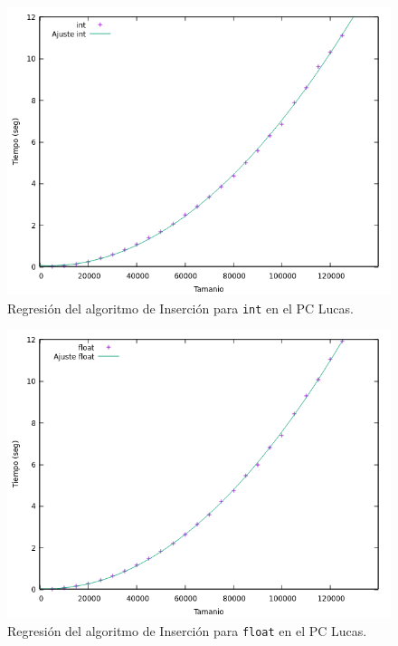 \documentclass[12pt]{article}
\begin{document}
    \begin{figure}
        \centering
        \includegraphics[width=0.8\linewidth]{images/Insercion/Ajuste int.png}
        \cprotect\caption{Regresión del algoritmo de Inserción para \verb|int| en el PC Lucas.}
        \label{fig:RegresionInsercionInt}
    \end{figure}

    \begin{figure}
        \centering
        \includegraphics[width=0.8\linewidth]{images/Insercion/Ajuste float.png}
        \cprotect\caption{Regresión del algoritmo de Inserción para \verb|float| en el PC Lucas.}
        \label{fig:RegresionInsercionFloat}
    \end{figure}
\end{document}
